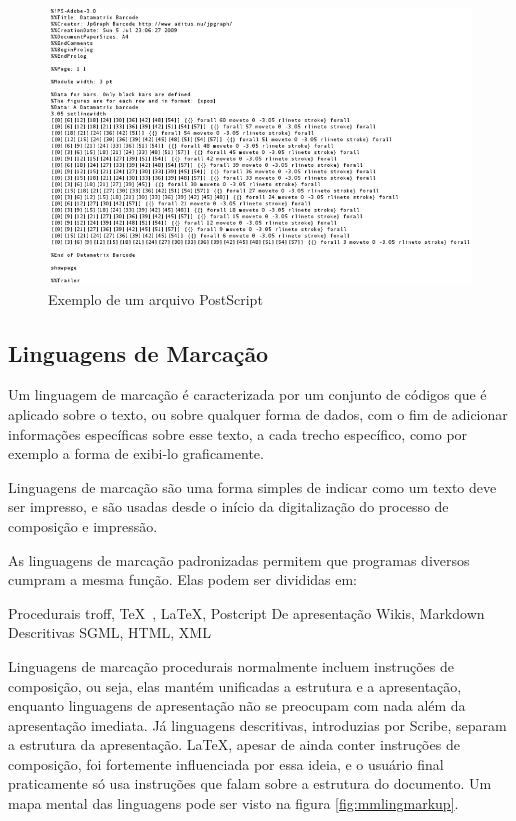 \begin{figure}[hbt]
    \centering
    \includegraphics[width=0.7\linewidth]{Images/ps}
    \caption[Exemplo de um arquivo PostScript]{Exemplo de um arquivo PostScript}
    \label{fig:psfile}
\end{figure}


\subsection{Linguagens de Marcação}

Um linguagem de marcação é caracterizada por um conjunto de códigos que é aplicado sobre o texto, ou sobre qualquer forma de dados, com o fim de adicionar informações específicas sobre esse texto, a cada trecho específico, como por exemplo a forma de exibi-lo graficamente.

Linguagens de marcação são uma forma simples de indicar como um texto deve ser impresso, e são usadas desde o início da digitalização do processo de composição e impressão.

As linguagens de marcação padronizadas permitem que programas diversos cumpram a mesma função. Elas podem ser divididas em:
\begin{outline} 
    \1 Procedurais
    \2 troff, \TeX\  , \LaTeX , Postcript
    \1 De apresentação
    \2 Wikis, Markdown
    \1 Descritivas
    \2 SGML, HTML, XML
\end{outline}

Linguagens de marcação procedurais normalmente incluem instruções de composição, ou seja, elas mantém unificadas a estrutura e a apresentação, enquanto linguagens de apresentação não se preocupam com nada além da apresentação imediata. Já linguagens descritivas, introduzias por Scribe, separam a estrutura da apresentação. \LaTeX, apesar de ainda conter instruções de composição, foi fortemente influenciada por essa ideia, e o usuário final praticamente só usa instruções que falam sobre a estrutura do documento. Um mapa mental das linguagens pode ser visto na figura \ref{fig:mmlingmarkup}\parencite{Adams:2007}.



